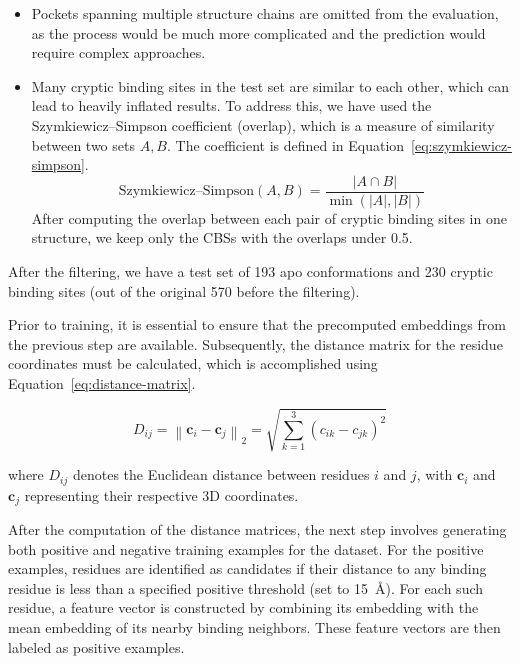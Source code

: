 \begin{itemize}
    \item Pockets spanning multiple structure chains are omitted from the evaluation, as the process would be much more complicated and the prediction would require complex approaches.
    \item Many cryptic binding sites in the test set are similar to each other, which can lead to heavily inflated results. To address this, we have used the Szymkiewicz–Simpson coefficient (overlap), which is a measure of similarity between two sets $A, B$. The coefficient is defined in Equation~\ref{eq:szymkiewicz-simpson}.
    \begin{equation}
        \text{Szymkiewicz–Simpson}(A, B) = \frac{|A \cap B|}{\min(|A|, |B|)}
        \label{eq:szymkiewicz-simpson}
    \end{equation}
    After computing the overlap between each pair of cryptic binding sites in one structure, we keep only the CBSs with the overlaps under 0.5.
\end{itemize}

After the filtering, we have a test set of 193 apo conformations and 230 cryptic binding sites (out of the original 570 before the filtering).

Prior to training, it is essential to ensure that the precomputed embeddings from the previous step are available. Subsequently, the distance matrix for the residue coordinates must be calculated, which is accomplished using Equation~\ref{eq:distance-matrix}.

\begin{equation}
D_{ij} = \left\| \mathbf{c}_i - \mathbf{c}_j \right\|_2 = \sqrt{ \sum_{k=1}^3 (c_{ik} - c_{jk})^2 }
\label{eq:distance-matrix}
\end{equation}

where $D_{ij}$ denotes the Euclidean distance between residues $i$ and $j$, with $\mathbf{c}_i$ and $\mathbf{c}_j$ representing their respective 3D coordinates.

After the computation of the distance matrices, the next step involves generating both positive and negative training examples for the dataset. For the positive examples, residues are identified as candidates if their distance to any binding residue is less than a specified positive threshold (set to 15~\AA). For each such residue, a feature vector is constructed by combining its embedding with the mean embedding of its nearby binding neighbors. These feature vectors are then labeled as positive examples.

